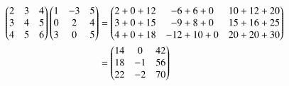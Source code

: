 
\begin{align}
    \begin{pmatrix}2&3&4\\
           3&4&5\\
           4&5&6\end{pmatrix}\begin{pmatrix}1&-3&5\\
                        0&2&4\\
                        3&0&5\end{pmatrix}
    &=\begin{pmatrix}2+0+12&-6+6+0&10+12+20\\
           3+0+15&-9+8+0&15+16+25\\
           4+0+18&-12+10+0&20+20+30\end{pmatrix}\\
    &=\begin{pmatrix}14&0&42\\
             18&-1&56\\
             22&-2&70\end{pmatrix}
\end{align}

